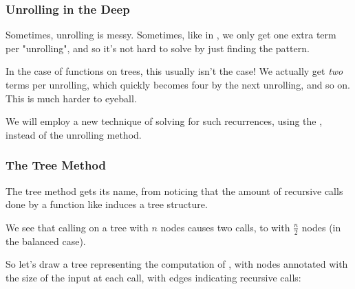 \documentclass[aspectratio=169]{beamer}
\begin{document}
\begin{frame}[fragile]
  \frametitle{Unrolling in the Deep}

  Sometimes, unrolling is messy. Sometimes, like in , we only get
  one extra term per "unrolling", and so it's not hard to solve by just
  finding the pattern.

  \pause
  \vspace{\fill}

  In the case of functions on trees, this usually isn't the case! We actually
  get \textit{two} terms per unrolling, which quickly becomes four by the
  next unrolling, and so on. This is much harder to eyeball.

  \pause
  \vspace{\fill}

  We will employ a new technique of solving for such recurrences, using the
  , instead of the unrolling method.
\end{frame}

\begin{frame}[fragile]
  \frametitle{The Tree Method}

  \rprs

  The tree method gets its name, from noticing that the amount of recursive
  calls done by a function like  induces a tree structure.

  \pause
  \vspace{\fill}

  We see that calling  on a tree with $n$ nodes causes two
  calls, to  with $\frac{n}{2}$ nodes (in the balanced case).

  \pause
  \vspace{\fill}

  So let's draw a tree representing the computation of , with nodes
  annotated with the size of the input at each call, with edges indicating
  recursive calls:

  \pause
  \vspace{\fill}


\end{frame}
\end{document}
